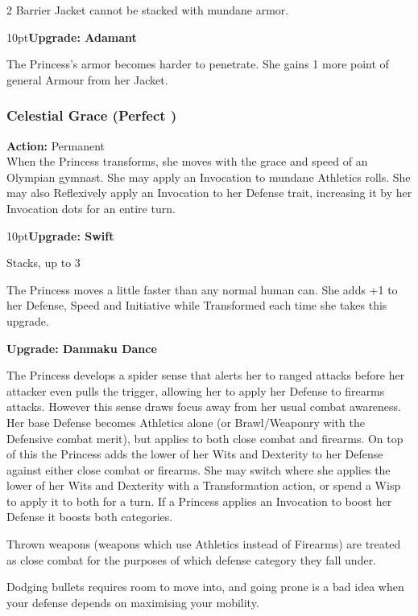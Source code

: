 \begin{multicols}{2}
Barrier Jacket cannot be stacked with mundane armor.

\begin{myindentpar}{10pt}\textbf{Upgrade: Adamant}

\noindent The Princess's armor becomes harder to penetrate. She gains 1 more point of general Armour from her Jacket. \end{myindentpar}

\subsubsection*{Celestial Grace (Perfect \textbullet)}

\noindent \textbf{Action:} Permanent \\

\noindent When the Princess transforms, she moves with the grace and speed of an Olympian gymnast. She may apply an Invocation to mundane Athletics rolls. She may also Reflexively apply an Invocation to her Defense trait, increasing it by her Invocation dots for an entire turn. 

\begin{myindentpar}{10pt}\textbf{Upgrade: Swift}

Stacks, up to 3

The Princess moves a little faster than any normal human can. She adds +1 to her Defense, Speed and Initiative while Transformed each time she takes this upgrade.

\textbf{Upgrade: Danmaku Dance}

The Princess develops a spider sense that alerts her to ranged attacks before her attacker even pulls the trigger, allowing her to apply her Defense to firearms attacks. However this sense draws focus away from her usual combat awareness. Her base Defense becomes Athletics alone (or Brawl/Weaponry with the Defensive combat merit), but applies to both close combat and firearms. On top of this the Princess adds the lower of her Wits and Dexterity to her Defense against either close combat or firearms. She may switch where she applies the lower of her Wits and Dexterity with a Transformation action, or spend a Wisp to apply it to both for a turn. If a Princess applies an Invocation to boost her Defense it boosts both categories. 

Thrown weapons (weapons which use Athletics instead of Firearms) are treated as close combat for the purposes of which defense category they fall under. 

Dodging bullets requires room to move into, and going prone is a bad idea when your defense depends on maximising your mobility. 


\end{myindentpar}
\end{multicols}
